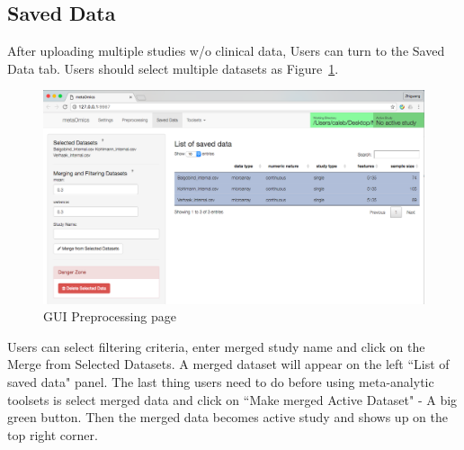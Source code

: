 \subsection{Saved Data}
After uploading multiple studies w/o clinical data,
Users can turn to the Saved Data tab.
Users should select multiple datasets as Figure~\ref{fig:GUImerge}.
\begin{figure}[H]
\begin{center}
\includegraphics[scale=0.35]{./figure/GUImerge}
\caption{GUI Preprocessing page}
\label{fig:GUImerge}
\end{center}
\end{figure}
Users can select filtering criteria, enter merged study name and click on the Merge from Selected Datasets.
A merged dataset will appear on the left ``List of saved data" panel.
The last thing users need to do before using meta-analytic toolsets is select merged data and click on 
``Make merged Active Dataset" - A big green button.
Then the merged data becomes active study and shows up on the top right corner.
